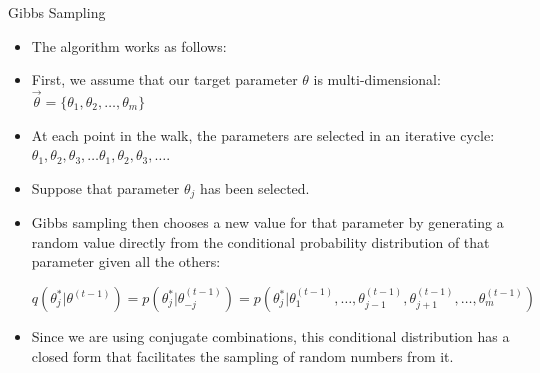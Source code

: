 \documentclass[handout]{beamer}
\begin{document}
\begin{frame}{Gibbs Sampling}
\scriptsize{

\begin{itemize}


\item The algorithm works as follows:

\item First, we assume that our target parameter $\theta$ is multi-dimensional: $\vec{\theta}=\{\theta_1,\theta_2,\dots,\theta_m\}$

\item At each point in the walk, the parameters are selected in an iterative cycle: $\theta_1, \theta_2, \theta_3 , \dots \theta_1, \theta_2, \theta_3, \dots.$

\item Suppose that parameter $\theta_j$ has been selected.

\item Gibbs sampling then chooses a new value for that parameter by generating a random value directly from
the conditional probability distribution of that parameter given all the others:

\begin{displaymath}
q(\theta^{*}_j|\theta^{(t-1)}) = p(\theta^{*}_j | \theta^{(t-1)}_{-j})= p(\theta^{*}_j | \theta^{(t-1)}_1,\dots, \theta^{(t-1)}_{j-1}, \theta^{(t-1)}_{j+1}, \dots,\theta^{(t-1)}_m)
\end{displaymath}


\item Since we are using conjugate combinations, this conditional distribution has a closed form that facilitates the sampling of random numbers from it.



\end{itemize}


} 
\end{frame}
\end{document}
